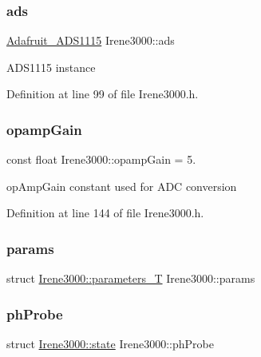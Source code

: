 \mbox{\label{class_irene3000_a1215e77ba761c9908d80d691f149e135}} 
\subsubsection{\texorpdfstring{ads}{ads}}
{\footnotesize\ttfamily \hyperlink{class_adafruit___a_d_s1115}{Adafruit\+\_\+\+A\+D\+S1115} Irene3000\+::ads\hspace{0.3cm}{\ttfamily [private]}}

A\+D\+S1115 instance 

Definition at line 99 of file Irene3000.\+h.

\mbox{\label{class_irene3000_a4e588985ca74e5076029d5dee81034f2}} 
\subsubsection{\texorpdfstring{opamp\+Gain}{opampGain}}
{\footnotesize\ttfamily const float Irene3000\+::opamp\+Gain = 5.\hspace{0.3cm}{\ttfamily [private]}}

op\+Amp\+Gain constant used for A\+DC conversion 

Definition at line 144 of file Irene3000.\+h.

\mbox{\label{class_irene3000_a136585a5ee7f9ac6ab52175fa153f8e3}} 
\subsubsection{\texorpdfstring{params}{params}}
{\footnotesize\ttfamily struct \hyperlink{struct_irene3000_1_1parameters___t}{Irene3000\+::parameters\+\_\+T} Irene3000\+::params\hspace{0.3cm}{\ttfamily [private]}}

\mbox{\label{class_irene3000_a997a4ee466fa1d5416e07e444965dc9e}} 
\subsubsection{\texorpdfstring{ph\+Probe}{phProbe}}
{\footnotesize\ttfamily struct \hyperlink{struct_irene3000_1_1state}{Irene3000\+::state}  Irene3000\+::ph\+Probe\hspace{0.3cm}{\ttfamily [private]}}

